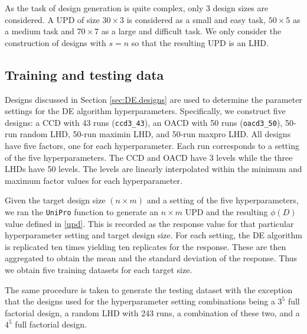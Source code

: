 \documentclass [PhD] {package/uclathes}
\begin{document}
As the task of design generation is quite complex, only 3 design sizes {are considered}.  A UPD of size $30\times3$ is considered as a small and easy task, $50\times5$ as a medium task and $70\times 7$ as a large and difficult task. We only consider the construction of designs with $s=n$ so that the resulting UPD is an LHD.

\subsection*{{Training and testing data}}

Designs discussed in {Section \ref{sec:DE.designs}} are used to determine the parameter settings for the DE algorithm hyperparameters. Specifically, we construct five designs: a CCD with 43 runs (\verb|ccd3_43|), an OACD with 50 runs (\verb|oacd3_50|), 50-run random LHD, 50-run maximin LHD, and 50-run maxpro LHD. All designs have five factors, one for each hyperparameter. Each run corresponds to a setting of the five hyperparameters. The CCD and OACD have 3 levels while the three LHDs have 50 levels. The levels are linearly interpolated within the minimum and maximum factor values for each hyperparameter.

Given the target design size $(n \times m)$ and a setting of the five hyperparameters, we ran the \texttt{UniPro} function to generate an $n \times m$ UPD and the resulting $\phi(D)$ value defined in  \eqref{upd}. This is recorded as the response value for that particular hyperparameter setting and target design size. For each setting, the DE algorithm is replicated ten times yielding ten replicates for the response. These are then aggregated to obtain the mean and the standard deviation of the response.
Thus we obtain five training datasets for each target size.



The same procedure is taken to generate the testing dataset with the exception that the designs used for the hyperparameter setting combinations being a $3^5$ full factorial design, a random LHD with 243 runs, a combination of these two, and a $4^5$ full factorial design.
\end{document}
